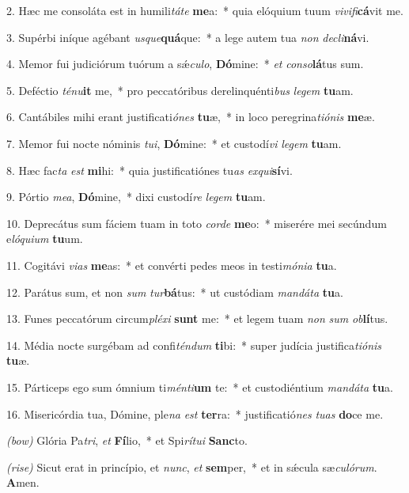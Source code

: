 ﻿2. Hæc me consoláta est in humili\textit{tá}\textit{te} \textbf{me}a:~* quia elóquium tuum \textit{vi}\textit{vi}\textit{fi}\textbf{cá}vit me.

3. Supérbi iníque agébant \textit{us}\textit{que}\textbf{quá}que:~* a lege autem tua \textit{non} \textit{de}\textit{cli}\textbf{ná}vi.

4. Memor fui judiciórum tuórum a s\'{\ae}\textit{cu}\textit{lo}, \textbf{Dó}mine:~* \textit{et} \textit{con}\textit{so}\textbf{lá}tus sum.

5. Deféctio \textit{té}\textit{nu}\textbf{it} me,~* pro peccatóribus derelinquénti\textit{bus} \textit{le}\textit{gem} \textbf{tu}am.

6. Cantábiles mihi erant justificati\textit{ó}\textit{nes} \textbf{tu}æ,~* in loco peregrina\textit{ti}\textit{ó}\textit{nis} \textbf{me}æ.

7. Memor fui nocte nóminis \textit{tu}\textit{i}, \textbf{Dó}mine:~* et custodí\textit{vi} \textit{le}\textit{gem} \textbf{tu}am.

8. Hæc fac\textit{ta} \textit{est} \textbf{mi}hi:~* quia justificatiónes tu\textit{as} \textit{ex}\textit{qui}\textbf{sí}vi.

9. Pórtio \textit{me}\textit{a}, \textbf{Dó}mine,~* dixi custodí\textit{re} \textit{le}\textit{gem} \textbf{tu}am.

10. Deprecátus sum fáciem tuam in toto \textit{cor}\textit{de} \textbf{me}o:~* miserére mei secúndum e\textit{ló}\textit{qui}\textit{um} \textbf{tu}um.

11. Cogitávi \textit{vi}\textit{as} \textbf{me}as:~* et convérti pedes meos in testi\textit{mó}\textit{ni}\textit{a} \textbf{tu}a.

12. Parátus sum, et non \textit{sum} \textit{tur}\textbf{bá}tus:~* ut custódiam \textit{man}\textit{dá}\textit{ta} \textbf{tu}a.

13. Funes peccatórum circum\textit{plé}\textit{xi} \textbf{sunt} me:~* et legem tuam \textit{non} \textit{sum} \textit{ob}\textbf{lí}tus.

14. Média nocte surgébam ad confi\textit{tén}\textit{dum} \textbf{ti}bi:~* super judícia justifica\textit{ti}\textit{ó}\textit{nis} \textbf{tu}æ.

15. Párticeps ego sum ómnium ti\textit{mén}\textit{ti}\textbf{um} te:~* et custodiéntium \textit{man}\textit{dá}\textit{ta} \textbf{tu}a.

16. Misericórdia tua, Dómine, ple\textit{na} \textit{est} \textbf{ter}ra:~* justificatió\textit{nes} \textit{tu}\textit{as} \textbf{do}ce me.

{\color{red}\textit{(bow)}} Glória Pa\textit{tri}, \textit{et} \textbf{Fí}lio,~* et Spi\textit{rí}\textit{tu}\textit{i} \textbf{Sanc}to.

{\color{red}\textit{(rise)}} Sicut erat in princípio, et \textit{nunc}, \textit{et} \textbf{sem}per,~* et in s\'{\ae}cula sæ\textit{cu}\textit{ló}\textit{rum}. \textbf{A}men.